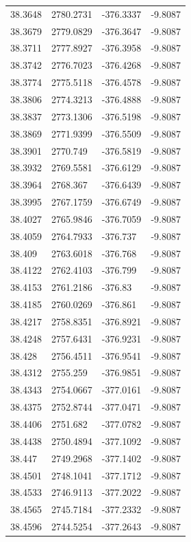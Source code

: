 \begin{table}[H]
\begin{tabular}{llll}
38.3648 & 2780.2731 & -376.3337 & -9.8087 \\
38.3679 & 2779.0829 & -376.3647 & -9.8087 \\
38.3711 & 2777.8927 & -376.3958 & -9.8087 \\
38.3742 & 2776.7023 & -376.4268 & -9.8087 \\
38.3774 & 2775.5118 & -376.4578 & -9.8087 \\
38.3806 & 2774.3213 & -376.4888 & -9.8087 \\
38.3837 & 2773.1306 & -376.5198 & -9.8087 \\
38.3869 & 2771.9399 & -376.5509 & -9.8087 \\
38.3901 & 2770.749 & -376.5819 & -9.8087 \\
38.3932 & 2769.5581 & -376.6129 & -9.8087 \\
38.3964 & 2768.367 & -376.6439 & -9.8087 \\
38.3995 & 2767.1759 & -376.6749 & -9.8087 \\
38.4027 & 2765.9846 & -376.7059 & -9.8087 \\
38.4059 & 2764.7933 & -376.737 & -9.8087 \\
38.409 & 2763.6018 & -376.768 & -9.8087 \\
38.4122 & 2762.4103 & -376.799 & -9.8087 \\
38.4153 & 2761.2186 & -376.83 & -9.8087 \\
38.4185 & 2760.0269 & -376.861 & -9.8087 \\
38.4217 & 2758.8351 & -376.8921 & -9.8087 \\
38.4248 & 2757.6431 & -376.9231 & -9.8087 \\
38.428 & 2756.4511 & -376.9541 & -9.8087 \\
38.4312 & 2755.259 & -376.9851 & -9.8087 \\
38.4343 & 2754.0667 & -377.0161 & -9.8087 \\
38.4375 & 2752.8744 & -377.0471 & -9.8087 \\
38.4406 & 2751.682 & -377.0782 & -9.8087 \\
38.4438 & 2750.4894 & -377.1092 & -9.8087 \\
38.447 & 2749.2968 & -377.1402 & -9.8087 \\
38.4501 & 2748.1041 & -377.1712 & -9.8087 \\
38.4533 & 2746.9113 & -377.2022 & -9.8087 \\
38.4565 & 2745.7184 & -377.2332 & -9.8087 \\
38.4596 & 2744.5254 & -377.2643 & -9.8087 \\

\end{tabular}
\end{table}

